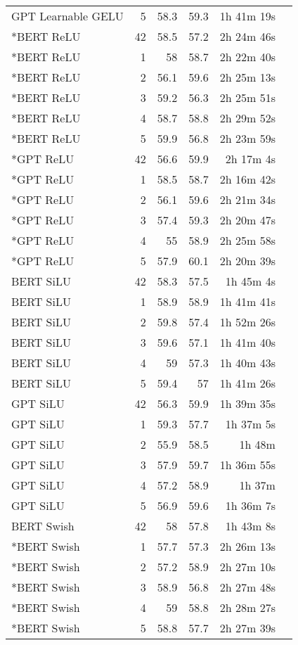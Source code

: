 \begin{table}[!htp]
\begin{tabular}{lrrrrr}
    GPT Learnable GELU &5 &58.3 &59.3 &1h 41m 19s \\
    *BERT ReLU &42 &58.5 &57.2 &2h 24m 46s \\
    *BERT ReLU &1 &58 &58.7 &2h 22m 40s \\
    *BERT ReLU &2 &56.1 &59.6 &2h 25m 13s \\
    *BERT ReLU &3 &59.2 &56.3 &2h 25m 51s \\
    *BERT ReLU &4 &58.7 &58.8 &2h 29m 52s \\
    *BERT ReLU &5 &59.9 &56.8 &2h 23m 59s \\
    *GPT ReLU &42 &56.6 &59.9 &2h 17m 4s \\
    *GPT ReLU &1 &58.5 &58.7 &2h 16m 42s \\
    *GPT ReLU &2 &56.1 &59.6 &2h 21m 34s \\
    *GPT ReLU &3 &57.4 &59.3 &2h 20m 47s \\
    *GPT ReLU &4 &55 &58.9 &2h 25m 58s \\
    *GPT ReLU &5 &57.9 &60.1 &2h 20m 39s \\
    BERT SiLU &42 &58.3 &57.5 &1h 45m 4s \\
    BERT SiLU &1 &58.9 &58.9 &1h 41m 41s \\
    BERT SiLU &2 &59.8 &57.4 &1h 52m 26s \\
    BERT SiLU &3 &59.6 &57.1 &1h 41m 40s \\
    BERT SiLU &4 &59 &57.3 &1h 40m 43s \\
    BERT SiLU &5 &59.4 &57 &1h 41m 26s \\
    GPT SiLU &42 &56.3 &59.9 &1h 39m 35s \\
    GPT SiLU &1 &59.3 &57.7 &1h 37m 5s \\
    GPT SiLU &2 &55.9 &58.5 &1h 48m \\
    GPT SiLU &3 &57.9 &59.7 &1h 36m 55s \\
    GPT SiLU &4 &57.2 &58.9 &1h 37m \\
    GPT SiLU &5 &56.9 &59.6 &1h 36m 7s \\
    BERT Swish &42 &58 &57.8 &1h 43m 8s \\
    *BERT Swish &1 &57.7 &57.3 &2h 26m 13s \\
    *BERT Swish &2 &57.2 &58.9 &2h 27m 10s \\
    *BERT Swish &3 &58.9 &56.8 &2h 27m 48s \\
    *BERT Swish &4 &59 &58.8 &2h 28m 27s \\
    *BERT Swish &5 &58.8 &57.7 &2h 27m 39s \\

\end{tabular}
\end{table}
